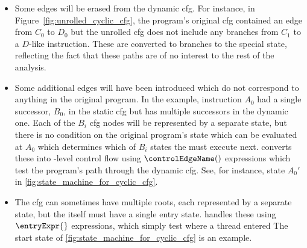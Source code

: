 \begin{itemize}
\item
  Some edges will be erased from the dynamic \gls{cfg}.  For instance,
  in Figure~\ref{fig:unrolled_cyclic_cfg}, the program's original
  \gls{cfg} contained an edge from $C_0$ to $D_0$ but the unrolled
  \gls{cfg} does not include any branches from $C_1$ to a $D$-like
  instruction.  These are converted to branches to the special
  {\stUnreached} state, reflecting the fact that these paths are of no
  interest to the rest of the analysis.

\item
  Some additional edges will have been introduced which do not
  correspond to anything in the original program.  In the example,
  instruction $A_0$ had a single successor, $B_0$, in the static
  \gls{cfg} but has multiple successors in the dynamic one.  Each of
  the $B_i$ \gls{cfg} nodes will be represented by a separate
  {\StateMachine} state, but there is no condition on the original
  program's state which can be evaluated at $A_0$ which determines
  which of $B_i$ states the {\StateMachine} must execute next.
  {\Technique} converts these into {\StateMachine}-level control flow
  using ${\controlEdgeName}()$ expressions which test the program's
  path through the dynamic \gls{cfg}.  See, for instance, state $A_0'$
  in \autoref{fig:state_machine_for_cyclic_cfg}.

\item
  The \gls{cfg} can sometimes have multiple roots, each represented by
  a separate {\StateMachine} state, but the {\StateMachine} itself
  must have a single entry state.  {\Technique} handles these using
  $\entryExpr{}$ expressions, which simply test where a thread entered
  The start state of \autoref{fig:state_machine_for_cyclic_cfg} is an
  example.

\end{itemize}
\begin{wrapfigure}{O}{6cm}
  \vspace{-20pt}
  \vspace{-12pt}
  \caption{}
  \label{fig:derive:example_dissassembly1}
  \vspace{-24pt}
\end{wrapfigure}

